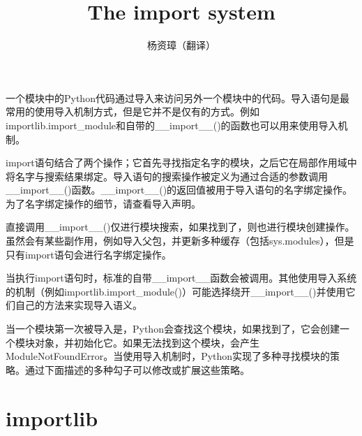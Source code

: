 \documentclass{ctexart}
\title{The import system}
\author{杨资璋（翻译）}
\begin{document}
\maketitle

一个模块中的Python代码通过导入来访问另外一个模块中的代码。导入语句是最常用的使用导入机制方式，但是它并不是仅有的方式。例如importlib.import_module和自带的__import__()的函数也可以用来使用导入机制。

import语句结合了两个操作；它首先寻找指定名字的模块，之后它在局部作用域中将名字与搜索结果绑定。导入语句的搜索操作被定义为通过合适的参数调用__import__()函数。__import__()的返回值被用于导入语句的名字绑定操作。为了名字绑定操作的细节，请查看导入声明。

直接调用__import__()仅进行模块搜索，如果找到了，则也进行模块创建操作。虽然会有某些副作用，例如导入父包，并更新多种缓存（包括sys.modules），但是只有import语句会进行名字绑定操作。

当执行import语句时，标准的自带__import__函数会被调用。其他使用导入系统的机制（例如importlib.import_module()）可能选择绕开__import__()并使用它们自己的方法来实现导入语义。

当一个模块第一次被导入是，Python会查找这个模块，如果找到了，它会创建一个模块对象，并初始化它。如果无法找到这个模块，会产生ModuleNotFoundError。当使用导入机制时，Python实现了多种寻找模块的策略。通过下面描述的多种勾子可以修改或扩展这些策略。

\section{importlib}

\end{document}
